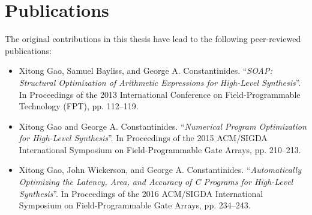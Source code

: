 \section{Publications}
\label{intro:sec:publications}

The original contributions in this thesis have lead to the following
peer-reviewed publications:
\begin{itemize}

    \item\cite{soap}
        Xitong Gao, Samuel Bayliss, and George A. Constantinides.
        ``\emph{SOAP\@: Structural Optimization of Arithmetic Expressions for
        High-Level Synthesis}''. In Proceedings of the 2013 International
        Conference on Field-Programmable Technology (FPT), pp. 112–119.

    \item\cite{soap2}
        Xitong Gao and George A. Constantinides. ``\emph{Numerical Program
        Optimization for High-Level Synthesis}''. In Proceedings of the
        2015 ACM/SIGDA International Symposium on Field-Programmable Gate
        Arrays, pp. 210–213.

    \item\cite{soap3}
        Xitong Gao, John Wickerson, and George A. Constantinides.
        ``\emph{Automatically Optimizing the Latency, Area, and Accuracy
        of C Programs for High-Level Synthesis}''. In Proceedings of the
        2016 ACM/SIGDA International Symposium on Field-Programmable Gate
        Arrays, pp. 234–243.

\end{itemize}
